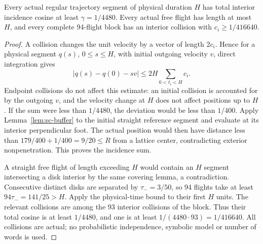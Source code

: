 \begin{sclemma}\label{lem:sc-anchor}
Every actual regular trajectory segment of physical duration $H$ has total interior incidence cosine at least $\gamma=1/4480$. Every actual free flight has length at most $H$, and every complete 94-flight block has an interior collision with $c_i\ge1/416640$.
\end{sclemma}
\begin{proof}
A collision changes the unit velocity by a vector of length $2c_i$. Hence for a physical segment $q(s)$, $0\le s\le H$, with initial outgoing velocity $v$, direct integration gives
\[
 |q(s)-q(0)-sv|\le2H\sum_{0<t_i<H}c_i.
\]
Endpoint collisions do not affect this estimate: an initial collision is accounted for by the outgoing $v$, and the velocity change at $H$ does not affect positions up to $H$. If the sum were less than $1/4480$, the deviation would be less than $1/400$. Apply Lemma~\ref{lem:sc-buffer} to the initial straight reference segment and evaluate at its interior perpendicular foot. The actual position would then have distance less than
$179/400+1/400=9/20\le R$ from a lattice center, contradicting exterior nonpenetration. This proves the incidence sum.

A straight free flight of length exceeding $H$ would contain an $H$ segment intersecting a disk interior by the same covering lemma, a contradiction. Consecutive distinct disks are separated by $\tau_-=3/50$, so 94 flights take at least $94\tau_-=141/25>H$. Apply the physical-time bound to their first $H$ units. The relevant collisions are among the 93 interior collisions of the block. Thus their total cosine is at least $1/4480$, and one is at least $1/(4480\cdot93)=1/416640$. All collisions are actual; no probabilistic independence, symbolic model or number of words is used.
\end{proof}

